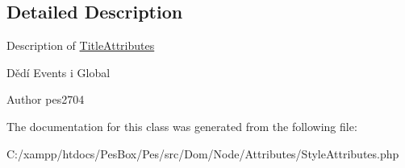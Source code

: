 \subsection{Detailed Description}
Description of \mbox{\hyperlink{class_pes_1_1_dom_1_1_node_1_1_attributes_1_1_title_attributes}{Title\+Attributes}}

Dědí Events i Global

\begin{DoxyAuthor}{Author}
pes2704 
\end{DoxyAuthor}


The documentation for this class was generated from the following file\+:\begin{DoxyCompactItemize}
\item 
C\+:/xampp/htdocs/\+Pes\+Box/\+Pes/src/\+Dom/\+Node/\+Attributes/Style\+Attributes.\+php\end{DoxyCompactItemize}
